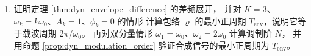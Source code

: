 \begin{enumerate}[leftmargin=3em, label=\textbf{题 \arabic*}]
    \item 证明定理 \ref{thm:dyn_envelope_difference} 的差频展开，
    并对 $K=3$、$\omega_k=k\omega_0$、$A_k=1$、$\phi_k=0$ 的情形
    计算包络 $\varrho$ 的最小正周期 $T_{\text{env}}$，说明它等于载波周期 $2\pi/\omega_0$。
    再对双分量情形 $\omega_1=\omega_0$、$\omega_2=2\omega_0$ 计算调制阶 $N$，
    并用命题 \ref{prop:dyn_modulation_order} 验证合成信号的最小正周期为 $T_{\text{env}}$。
\end{enumerate}

